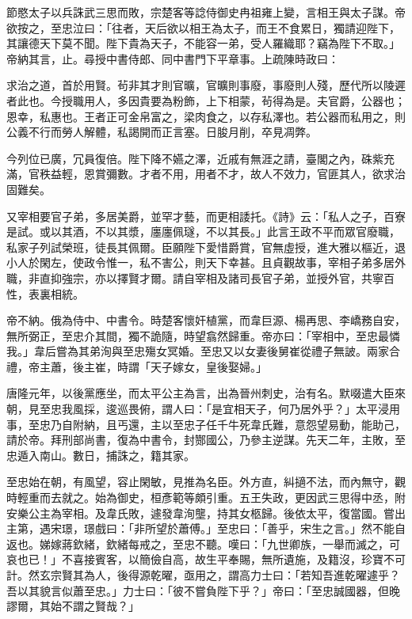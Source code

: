 \begin{pinyinscope}
 節愍太子以兵誅武三思而敗，宗楚客等諗侍御史冉祖雍上變，言相王與太子謀。帝欲按之，至忠泣曰：「往者，天后欲以相王為太子，而王不食累日，獨請迎陛下，其讓德天下莫不聞。陛下貴為天子，不能容一弟，受人羅織耶？竊為陛下不取。」帝納其言，止。尋授中書侍郎、同中書門下平章事。上疏陳時政曰：



 求治之道，首於用賢。茍非其才則官曠，官曠則事廢，事廢則人殘，歷代所以陵遲者此也。今授職用人，多因貴要為粉飾，上下相蒙，茍得為是。夫官爵，公器也；恩幸，私惠也。王者正可金帛富之，梁肉食之，以存私澤也。若公器而私用之，則公義不行而勞人解體，私謁開而正言塞。日朘月削，卒見凋弊。



 今列位已廣，冗員復倍。陛下降不嬿之澤，近戚有無涯之請，臺閣之內，硃紫充滿，官秩益輕，恩賞彌數。才者不用，用者不才，故人不效力，官匪其人，欲求治固難矣。



 又宰相要官子弟，多居美爵，並罕才藝，而更相諉托。《詩》云：「私人之子，百寮是試。或以其酒，不以其漿，廛廛佩璲，不以其長。」此言王政不平而眾官廢職，私家子列試榮班，徒長其佩爾。臣願陛下愛惜爵賞，官無虛授，進大雅以樞近，退小人於閑左，使政令惟一，私不害公，則天下幸甚。且貞觀故事，宰相子弟多居外職，非直抑強宗，亦以擇賢才爾。請自宰相及諸司長官子弟，並授外官，共寧百性，表裏相統。



 帝不納。俄為侍中、中書令。時楚客懷奸植黨，而韋巨源、楊再思、李嶠務自安，無所弼正，至忠介其間，獨不詭隨，時望翕然歸重。帝亦曰：「宰相中，至忠最憐我。」韋后嘗為其弟洵與至忠殤女冥婚。至忠又以女妻後舅崔從禮子無詖。兩家合禮，帝主蕭，後主崔，時謂「天子嫁女，皇後娶婦。」



 唐隆元年，以後黨應坐，而太平公主為言，出為晉州刺史，治有名。默啜遣大臣來朝，見至忠我風採，逡巡畏俯，謂人曰：「是宜相天子，何乃居外乎？」太平浸用事，至忠乃自附納，且丐還，主以至忠子任千牛死韋氏難，意怨望易動，能助己，請於帝。拜刑部尚書，復為中書令，封酂國公，乃參主逆謀。先天二年，主敗，至忠遁入南山。數日，捕誅之，籍其家。



 至忠始在朝，有風望，容止閑敏，見推為名臣。外方直，糾擿不法，而內無守，觀時輕重而去就之。始為御史，桓彥範等頗引重。五王失政，更因武三思得中丞，附安樂公主為宰相。及韋氏敗，遽發韋洵壟，持其女柩歸。後依太平，復當國。嘗出主第，遇宋璟，璟戲曰：「非所望於蕭傅。」至忠曰：「善乎，宋生之言。」然不能自返也。娣嫁蔣欽緒，欽緒每戒之，至忠不聽。嘆曰：「九世卿族，一舉而滅之，可哀也已！」不喜接賓客，以簡儉自高，故生平奉賜，無所遺施，及籍沒，珍寶不可計。然玄宗賢其為人，後得源乾曜，亟用之，謂高力士曰：「若知吾進乾曜遽乎？吾以其貌言似蕭至忠。」力士曰：「彼不嘗負陛下乎？」帝曰：「至忠誠國器，但晚謬爾，其始不謂之賢哉？」




\end{pinyinscope}
